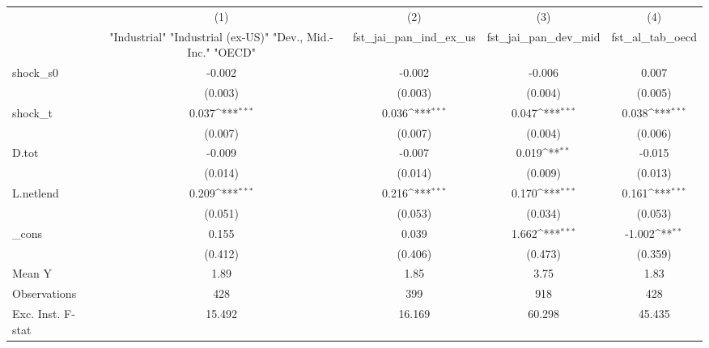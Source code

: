 {
\def\sym#1{\ifmmode^{#1}\else\(^{#1}\)\fi}
\begin{tabular}{l*{4}{c}}
\toprule
            &\multicolumn{1}{c}{(1)}&\multicolumn{1}{c}{(2)}&\multicolumn{1}{c}{(3)}&\multicolumn{1}{c}{(4)}\\
            &\multicolumn{1}{c}{ "Industrial" "Industrial (ex-US)" "Dev., Mid.-Inc." "OECD" }&\multicolumn{1}{c}{fst\_jai\_pan\_ind\_ex\_us}&\multicolumn{1}{c}{fst\_jai\_pan\_dev\_mid}&\multicolumn{1}{c}{fst\_al\_tab\_oecd}\\
\midrule
shock\_s0    &      -0.002         &      -0.002         &      -0.006         &       0.007         \\
            &     (0.003)         &     (0.003)         &     (0.004)         &     (0.005)         \\
\addlinespace
shock\_t     &       0.037\sym{***}&       0.036\sym{***}&       0.047\sym{***}&       0.038\sym{***}\\
            &     (0.007)         &     (0.007)         &     (0.004)         &     (0.006)         \\
\addlinespace
D.tot       &      -0.009         &      -0.007         &       0.019\sym{**} &      -0.015         \\
            &     (0.014)         &     (0.014)         &     (0.009)         &     (0.013)         \\
\addlinespace
L.netlend   &       0.209\sym{***}&       0.216\sym{***}&       0.170\sym{***}&       0.161\sym{***}\\
            &     (0.051)         &     (0.053)         &     (0.034)         &     (0.053)         \\
\addlinespace
\_cons      &       0.155         &       0.039         &       1.662\sym{***}&      -1.002\sym{**} \\
            &     (0.412)         &     (0.406)         &     (0.473)         &     (0.359)         \\
\midrule
Mean Y      &        1.89         &        1.85         &        3.75         &        1.83         \\
Observations&         428         &         399         &         918         &         428         \\
Exc. Inst. F-stat&      15.492         &      16.169         &      60.298         &      45.435         \\
\bottomrule
\end{tabular}
}
